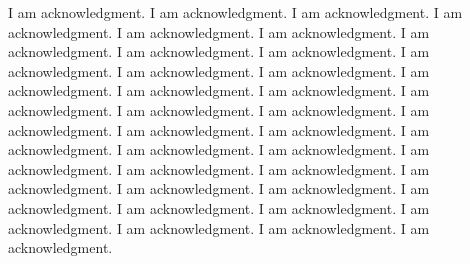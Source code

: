 \begin{acknowledgements}
\addchaptertocentry{\acknowledgementname} %

I am acknowledgment. I am acknowledgment. I am acknowledgment. I am acknowledgment. I am acknowledgment. I am acknowledgment. I am acknowledgment. I am acknowledgment. I am acknowledgment. I am acknowledgment. I am acknowledgment. I am acknowledgment. I am acknowledgment. I am acknowledgment. I am acknowledgment. I am acknowledgment. I am acknowledgment. I am acknowledgment. I am acknowledgment. I am acknowledgment. I am acknowledgment. I am acknowledgment. I am acknowledgment. I am acknowledgment. I am acknowledgment. I am acknowledgment. I am acknowledgment. I am acknowledgment. I am acknowledgment. I am acknowledgment. I am acknowledgment. I am acknowledgment. I am acknowledgment. I am acknowledgment. I am acknowledgment. I am acknowledgment. I am acknowledgment. 
\end{acknowledgements}